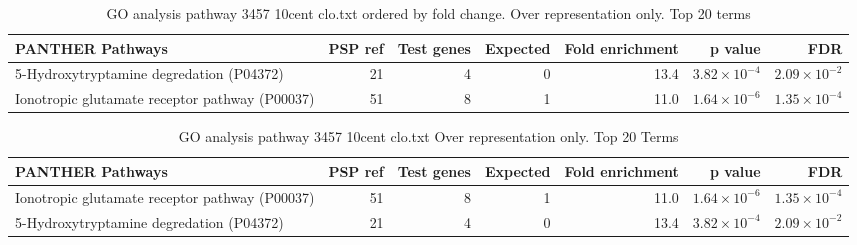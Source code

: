 \begin{table}[ht]
\centering
\begin{adjustbox}{width=\textwidth}

\begin{tabular}{lrrrrrr}
  \hline
PANTHER Pathways & PSP ref & Test genes & Expected & Fold enrichment & p value & FDR \\ 
  \hline
5-Hydroxytryptamine degredation (P04372) & 21 & 4 & 0 & 13.4 & $3.82 \times 10^{-4}$ & $2.09 \times 10^{-2}$ \\ 
  Ionotropic glutamate receptor pathway (P00037) & 51 & 8 & 1 & 11.0 & $1.64 \times 10^{-6}$ & $1.35 \times 10^{-4}$ \\ 
   \hline
\end{tabular}
\end{adjustbox}
\caption{GO analysis pathway 3457 10cent clo.txt ordered by fold change. Over representation only. Top 20 terms} 
\label{tab:GO analysis pathway 3457 10cent clo.txt ordered by fold change. Over representation only. Top 20 terms}
\end{table}
\begin{table}[ht]
\centering
\begin{adjustbox}{width=\textwidth}

\begin{tabular}{lrrrrrr}
  \hline
PANTHER Pathways & PSP ref & Test genes & Expected & Fold enrichment & p value & FDR \\ 
  \hline
Ionotropic glutamate receptor pathway (P00037) & 51 & 8 & 1 & 11.0 & $1.64 \times 10^{-6}$ & $1.35 \times 10^{-4}$ \\ 
  5-Hydroxytryptamine degredation (P04372) & 21 & 4 & 0 & 13.4 & $3.82 \times 10^{-4}$ & $2.09 \times 10^{-2}$ \\ 
   \hline
\end{tabular}
\end{adjustbox}
\caption{GO analysis pathway 3457 10cent clo.txt Over representation only. Top 20 Terms} 
\label{tab:GO analysis pathway 3457 10cent clo.txt Over representation only. Top 20 Terms}
\end{table}
\clearpage



